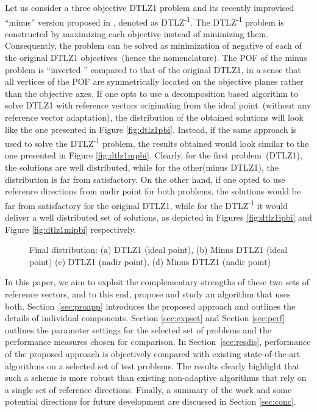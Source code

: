 \documentclass{sig-alternate}
\begin{document}
Let us consider a three objective DTLZ1 \cite{deb2005scalable} problem and its recently improvised ``minus'' version proposed in \cite{ishibuchi2016inverse}, denoted as DTLZ\textsuperscript{-1}. The DTLZ\textsuperscript{-1} problem is constructed by maximizing each objective instead of minimizing them. Consequently, the problem can be solved as minimization of negative of each of the original DTLZ1 objectives~(hence the nomenclature). The POF of the minus problem is ``inverted '' compared to that of the original DTLZ1, in a sense that all vertices of the POF are symmetrically located on the objective planes rather than the objective axes. If one opts to use a decomposition based algorithm to solve DTLZ1 with reference vectors originating from the ideal point~(without any reference vector adaptation), the distribution of the obtained solutions will look like the one presented in Figure \ref{fig:dtlz1pbi}. Instead, if the same approach is used to solve the DTLZ\textsuperscript{-1} problem, the results obtained would look similar to the one presented in Figure \ref{fig:dtlz1mpbi}. Clearly, for the first problem~(DTLZ1), the solutions are well distributed, while for the other(minus DTLZ1), the distribution is far from satisfactory. On the other hand, if one opted to use reference directions from nadir point for both problems, the solutions would be far from satisfactory for the original DTLZ1, while for the DTLZ\textsuperscript{-1} it would deliver a well distributed set of solutions, as depicted in Figures \ref{fig:dtlz1ipbi} and Figure \ref{fig:dtlz1mipbi} respectively.

\begin{figure*}[!htb]
\centering
{}
\label{fig:rationale}
\caption{Final distribution: (a) DTLZ1 (ideal point), (b) Minus DTLZ1 (ideal point) (c) DTLZ1 (nadir point),  (d) Minus DTLZ1 (nadir point)}
\end{figure*}

In this paper, we aim to exploit the complementary strengths of these two sets of reference vectors, and to this end, propose and study an algorithm that uses both. Section~\ref{sec:proapp} introduces the proposed approach and outlines the details of individual components. Section \ref{sec:expset} and Section \ref{sec:perf} outlines the parameter settings for the selected set of problems and the performance measures chosen for comparison. In Section~\ref{sec:resdis}, performance of the proposed approach is objectively compared with existing state-of-the-art algorithms on a selected set of test problems. The results clearly highlight that such a scheme is more robust than existing non-adaptive algorithms that rely on a single set of reference directions. Finally, a summary of the work and some potential directions for future development are discussed in Section \ref{sec:conc}.
\end{document}
